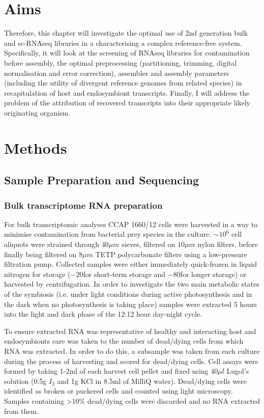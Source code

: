\section{Aims}

Therefore, this chapter will investigate the optimal use of 2nd generation bulk and sc-RNAseq libraries
in a characterising a complex reference-free system.  Specifically, it will look at the screening of RNAseq libraries for contamination
before assembly, the optimal preprocessing (partitioning, trimming, digital normalisation and error correction), assembler and assembly
parameters (including the utility of divergent reference genomes from related species) in recapitulation of host and endosymbiont transcripts.
Finally, I will address the problem of the attribution of recovered transcripts into their appropriate likely originating organism.  

\section{Methods} 

\subsection{Sample Preparation and Sequencing}

\subsubsection{Bulk transcriptome RNA preparation}
For bulk transcriptomic analyses CCAP 1660/12 cells were harvested in a way to minimise 
contamination from bacterial prey species in the culture. \(\sim 10^{6}\) 
cell aliquots were strained through \(40\mu m\) sieves, filtered on 
\(10 \mu m\) nylon filters, 
before finally being filtered on \(8 \mu m\) TETP polycarbonate filters using a 
low-pressure filtration pump.  Collected samples were either immediately 
quick-frozen in liquid nitrogen for storage (\(-20\)\celsius for short-term storage 
and \(-80\)\celsius for longer storage) or harvested by centrifugation.  
In order to investigate the two main metabolic states of the symbiosis 
(i.e. under light conditions during active photosynthesis and in the dark 
when no photosynthesis is taking place) samples were extracted 5 hours into 
the light and dark phase of the 12:12 hour day-night cycle.

To ensure extracted RNA was representative of healthy and interacting host 
and endosymbionts care was taken to the number of dead/dying cells 
from which RNA was extracted.  In order to do this, a subsample was taken 
from each culture during the process of harvesting and scored for dead/dying cells.  
Cell assays were formed by taking 1-2ml of each harvest cell pellet and 
fixed using 40\(\mu l\) Lugol's solution (0.5g \(I_{2}\) and 1g KCl in 8.5ml 
of MilliQ water). Dead/dying cells were identified as broken or puckered cells 
and counted using light microscopy.  Samples containing >10\% dead/dying cells 
were discarded and no RNA extracted from them.

